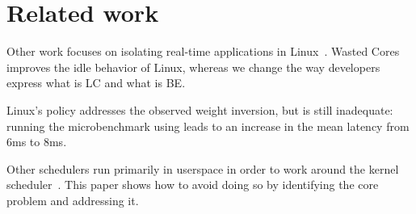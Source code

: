 \section{Related work}

Other work focuses on isolating real-time applications in
Linux~\cite{rt-in-linux, state-rt-linux}. Wasted Cores~\cite{wasted-cores}
improves the idle behavior of Linux, whereas we change the way developers
express what is LC and what is BE.

Linux's \schedidle{} policy addresses the observed weight inversion, but is
still inadequate: running the microbenchmark using \schedidle{} leads to an
increase in the mean latency from 6ms to 8ms.

Other schedulers run primarily in userspace in order to work around the kernel
scheduler~\cite{perfiso,caladan,skyloft}. This paper shows how to avoid doing so
by identifying the core problem and addressing it.